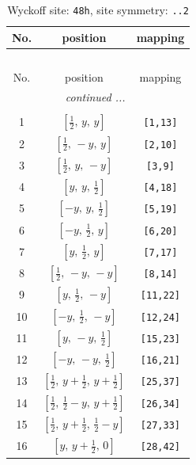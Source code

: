 \documentclass[fleqn,8pt]{jsarticle}
\begin{document}
\begin{longtable}{ccc}
\caption{Wyckoff site: {\tt 48h}, site symmetry: {\tt ..2}}
 \\
 \hline \hline
No. & position & mapping \\ \hline \endfirsthead

\multicolumn{2}{l}{\tablename\ \thetable{}} \\
 \hline \hline
No. & position & mapping \\ \hline \endhead

 \hline \hline
\multicolumn{2}{r}{\footnotesize\it continued ...} \\ \endfoot

 \hline \hline
\multicolumn{2}{r}{} \\ \endlastfoot

1 & $\left[ \frac{1}{2},\, y,\, y \right]$ & {\tt [1,13]} \\ \hline
2 & $\left[ \frac{1}{2},\, - y,\, y \right]$ & {\tt [2,10]} \\ \hline
3 & $\left[ \frac{1}{2},\, y,\, - y \right]$ & {\tt [3,9]} \\ \hline
4 & $\left[ y,\, y,\, \frac{1}{2} \right]$ & {\tt [4,18]} \\ \hline
5 & $\left[ - y,\, y,\, \frac{1}{2} \right]$ & {\tt [5,19]} \\ \hline
6 & $\left[ - y,\, \frac{1}{2},\, y \right]$ & {\tt [6,20]} \\ \hline
7 & $\left[ y,\, \frac{1}{2},\, y \right]$ & {\tt [7,17]} \\ \hline
8 & $\left[ \frac{1}{2},\, - y,\, - y \right]$ & {\tt [8,14]} \\ \hline
9 & $\left[ y,\, \frac{1}{2},\, - y \right]$ & {\tt [11,22]} \\ \hline
10 & $\left[ - y,\, \frac{1}{2},\, - y \right]$ & {\tt [12,24]} \\ \hline
11 & $\left[ y,\, - y,\, \frac{1}{2} \right]$ & {\tt [15,23]} \\ \hline
12 & $\left[ - y,\, - y,\, \frac{1}{2} \right]$ & {\tt [16,21]} \\ \hline
13 & $\left[ \frac{1}{2},\, y + \frac{1}{2},\, y + \frac{1}{2} \right]$ & {\tt [25,37]} \\ \hline
14 & $\left[ \frac{1}{2},\, \frac{1}{2} - y,\, y + \frac{1}{2} \right]$ & {\tt [26,34]} \\ \hline
15 & $\left[ \frac{1}{2},\, y + \frac{1}{2},\, \frac{1}{2} - y \right]$ & {\tt [27,33]} \\ \hline
16 & $\left[ y,\, y + \frac{1}{2},\, 0 \right]$ & {\tt [28,42]} \\ \hline

\end{longtable}
\end{document}

